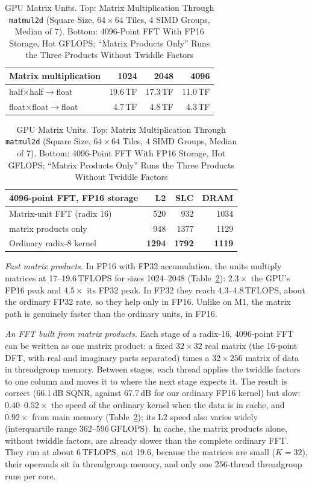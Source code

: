 \documentclass[conference]{IEEEtran}
\newcommand{\GF}{\,GFLOPS}
\begin{document}
\begin{table}[t]
\centering
\caption{GPU Matrix Units. Top: Matrix Multiplication Through \texttt{matmul2d} (Square Size,
$64\times64$ Tiles, 4 SIMD Groups, Median of 7). Bottom: 4096-Point FFT With FP16 Storage, Hot GFLOPS;
``Matrix Products Only'' Runs the Three Products Without Twiddle Factors}
\label{tab:mma}
\footnotesize
\begin{tabular}{@{}lrrr@{}}
\toprule
\textbf{Matrix multiplication} & \textbf{1024} & \textbf{2048} & \textbf{4096} \\
\midrule
half$\times$half$\to$float & 19.6\,TF & 17.3\,TF & 11.0\,TF \\
float$\times$float$\to$float & 4.7\,TF & 4.8\,TF & 4.3\,TF \\
\bottomrule
\end{tabular}

\medskip
\begin{tabular}{@{}lrrr@{}}
\toprule
\textbf{4096-point FFT, FP16 storage} & \textbf{L2} & \textbf{SLC} & \textbf{DRAM} \\
\midrule
Matrix-unit FFT (radix 16) & 520 & 932 & 1034 \\
\quad matrix products only & 948 & 1377 & 1129 \\
Ordinary radix-8 kernel & \textbf{1294} & \textbf{1792} & \textbf{1119} \\
\bottomrule
\end{tabular}
\end{table}

\textit{Fast matrix products.} In FP16 with FP32 accumulation, the units multiply matrices at
17--19.6\,TFLOPS for sizes 1024--2048 (Table~\ref{tab:mma}): $2.3\times$ the GPU's FP16 peak and
$4.5\times$ its FP32 peak. In FP32 they reach 4.3--4.8\,TFLOPS, about the ordinary FP32 rate, so they
help only in FP16. Unlike on M1, the matrix path is genuinely faster than the ordinary units, in FP16.

\textit{An FFT built from matrix products.} Each stage of a radix-16, 4096-point FFT can be written as
one matrix product: a fixed $32\times32$ real matrix (the 16-point DFT, with real and imaginary parts
separated) times a $32\times256$ matrix of data in threadgroup memory. Between stages, each thread
applies the twiddle factors to one column and moves it to where the next stage expects it. The result is
correct (66.1\,dB SQNR, against 67.7\,dB for our ordinary FP16 kernel) but slow: $0.40$--$0.52\times$
the speed of the ordinary kernel when the data is in cache, and $0.92\times$ from main memory
(Table~\ref{tab:mma}); its L2 speed also varies widely (interquartile range 362--596\GF{}). In cache,
the matrix products alone, without twiddle factors, are already slower than the complete ordinary FFT.
They run at about 6\,TFLOPS, not 19.6, because the matrices are small ($K=32$), their operands sit in
threadgroup memory, and only one 256-thread threadgroup runs per core.
\end{document}
